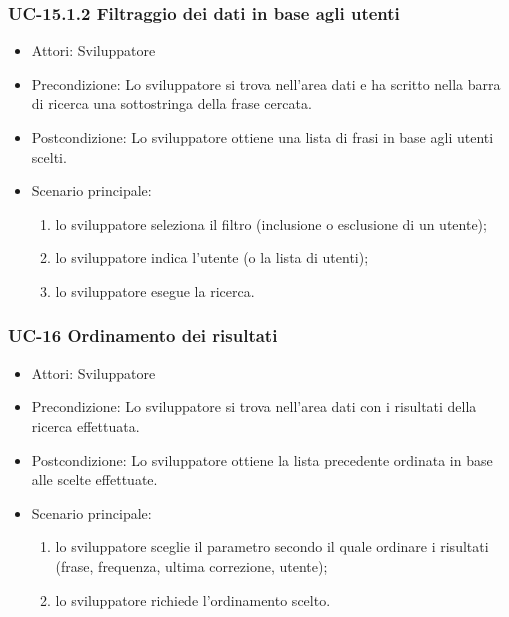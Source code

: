 	\subsubsection{UC-15.1.2 Filtraggio dei dati in base agli utenti}	
		\begin{itemize}
			\item Attori: Sviluppatore
			\item Precondizione: Lo sviluppatore si trova nell'area dati e ha scritto nella barra di ricerca una sottostringa della frase cercata.
			\item Postcondizione: Lo sviluppatore ottiene una lista di frasi in base agli utenti scelti.
			\item Scenario principale:
				\begin{enumerate}
					\item lo sviluppatore seleziona il filtro (inclusione o esclusione di un utente);
					\item lo sviluppatore indica l'utente (o la lista di utenti);
					\item lo sviluppatore esegue la ricerca.
				\end{enumerate}
		\end{itemize}	
	
	\subsubsection{UC-16 Ordinamento dei risultati}
		\begin{itemize}
			\item Attori: Sviluppatore
			\item Precondizione: Lo sviluppatore si trova nell'area dati con i risultati della ricerca effettuata.
			\item Postcondizione: Lo sviluppatore ottiene la lista precedente ordinata in base alle scelte effettuate.
			\item Scenario principale:
				\begin{enumerate}
					\item lo sviluppatore sceglie il parametro secondo il quale ordinare i risultati (frase, frequenza, ultima correzione, utente);
					\item lo sviluppatore richiede l'ordinamento scelto.
				\end{enumerate}
		\end{itemize} 
	
